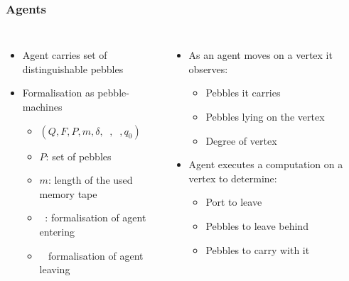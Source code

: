 \documentclass{beamer}
\DeclareMathOperator{\din}{\delta_{\mathit{in}}}
\DeclareMathOperator{\dout}{\delta_{\mathit{out}}}
\begin{document}
\begin{frame}
  \frametitle{Agents}
  \begin{columns}
    \begin{itemize}
      \item Agent carries set of distinguishable pebbles
      \item Formalisation as pebble-machines
        \begin{itemize}
          \item $(Q,F,P,m,\delta,\din,\dout,q_{0})$
          \item $P$: set of pebbles
          \item $m$: length of the used memory tape
          \item $\din$: formalisation of agent entering
          \item $\dout$ formalisation of agent leaving
        \end{itemize}
    \end{itemize}
    \begin{itemize}
      \item As an agent moves on a vertex it observes:
        \begin{itemize}
          \item Pebbles it carries
          \item Pebbles lying on the vertex
          \item Degree of vertex
        \end{itemize}
      \item Agent executes a computation on a vertex to determine:
        \begin{itemize}
          \item Port to leave
          \item Pebbles to leave behind
          \item Pebbles to carry with it
        \end{itemize}
    \end{itemize}
  \end{columns}
\end{frame}
\end{document}
